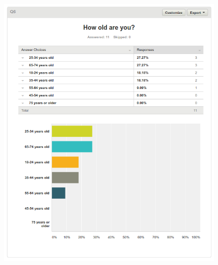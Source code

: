 \begin{figure}[H]
\begin{adjustbox}{width=1\textwidth,center=\textwidth}
  \centering
  \includegraphics[scale=1]{surveys/q6.png}
\end{adjustbox}
\end{figure}